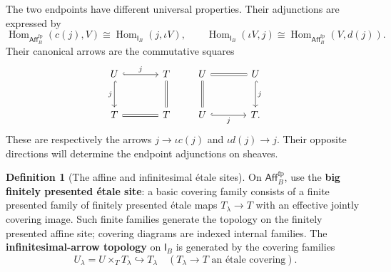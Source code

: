 \documentclass[11pt,a4paper]{article}
\numberwithin{algorithm}{section}
\numberwithin{equation}{section}
\theoremstyle{definition}
\newtheorem{definition}[definition]{Definition}
\theoremstyle{remark}
\theoremstyle{plain}
\newcommand{\Hom}{\operatorname{Hom}}
\newcommand{\AffB}{\mathsf{Aff}^{\mathrm{fp}}_B}
\newcommand{\InfB}{\mathsf I_B}
\theoremstyle{definition}
\theoremstyle{plain}
\begin{document}
The two endpoints have different universal properties. Their
adjunctions are expressed by
\[
 \Hom_{\AffB}(c(j),V)\cong\Hom_{\InfB}(j,\iota V),
 \qquad
 \Hom_{\InfB}(\iota V,j)\cong\Hom_{\AffB}(V,d(j)).
\]
Their canonical arrows are the commutative squares
\[
\begin{tikzcd}[column sep=large,row sep=large]
 U \arrow[r,hook,"{j}"] \arrow[d,hook,"{j}"']
   & T \arrow[d,equal]\\
 T \arrow[r,equal] & T
\end{tikzcd}
\qquad
\begin{tikzcd}[column sep=large,row sep=large]
 U \arrow[r,equal] \arrow[d,equal]
   & U \arrow[d,hook,"{j}"]\\
 U \arrow[r,hook,"{j}"'] & T .
\end{tikzcd}
\]
These are respectively the arrows $j\to\iota c(j)$ and
$\iota d(j)\to j$. Their opposite directions will determine the
endpoint adjunctions on sheaves.


\begin{definition}[The affine and infinitesimal \'etale sites]\label{def:etale-sites}
On $\AffB$, use the \textbf{big finitely presented \'etale site}:
a basic covering family consists of a finite presented family of
finitely presented \'etale maps $T_\lambda\to T$ with an effective
jointly covering image.  Such finite families generate the topology
on the finitely presented affine site; covering diagrams are indexed internal families.
The \textbf{infinitesimal-arrow topology} on $\InfB$ is generated by
the covering families
\[
 U_\lambda=U\times_TT_\lambda\hookrightarrow T_\lambda
\quad(T_\lambda\to T\text{ an \'etale covering}).
\]
\end{definition}
\end{document}
